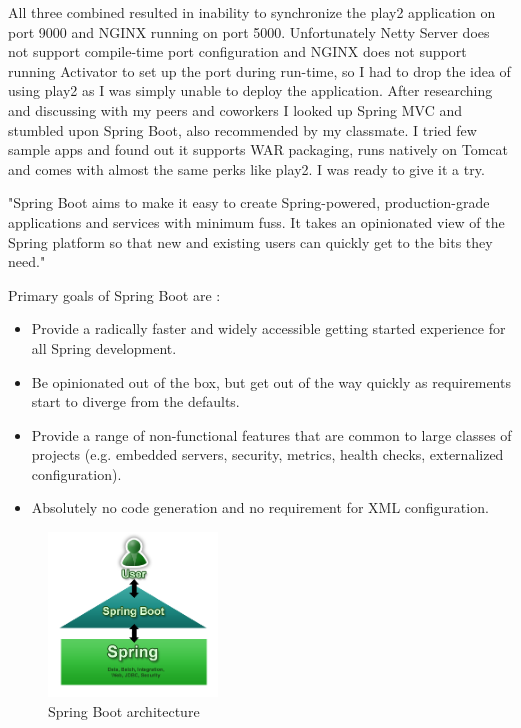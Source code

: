 All three combined resulted in inability to synchronize the play2 application on port 9000 and NGINX running on port 5000. Unfortunately Netty Server does not support compile-time port configuration and NGINX does not support running Activator to set up the port during run-time, so I had to drop the idea of using play2 as I was simply unable to deploy the application. After researching and discussing with my peers and coworkers I looked up Spring MVC and stumbled upon Spring Boot, also recommended by my classmate. I tried few sample apps and found out it supports WAR packaging, runs natively on Tomcat and comes with almost the same perks like play2. I was ready to give it a try.

"Spring Boot aims to make it easy to create Spring-powered, production-grade applications and services with minimum fuss. It takes an opinionated view of the Spring platform so that new and existing users can quickly get to the bits they need." \cite{spring-boot-blog}

Primary goals of Spring Boot are \cite{spring-boot-doc}:

\begin{itemize}
	\item Provide a radically faster and widely accessible getting started experience for all Spring development.
	\item Be opinionated out of the box, but get out of the way quickly as requirements start to diverge from the defaults.
	\item Provide a range of non-functional features that are common to large classes of projects (e.g. embedded servers, security, metrics, health checks, externalized configuration).
	\item Absolutely no code generation and no requirement for XML configuration.
\end{itemize}

\begin{figure}[!ht]
	\centering
	\includegraphics[width=0.4\textwidth]{figures/04_implementation/spring}
    \caption{Spring Boot architecture}
\end{figure}

